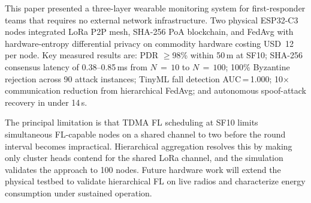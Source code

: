 \documentclass[journal]{IEEEtran}
\begin{document}
This paper presented a three-layer wearable monitoring system for
first-responder teams that requires no external network infrastructure.
Two physical ESP32-C3 nodes integrated LoRa P2P mesh, SHA-256 PoA
blockchain, and FedAvg with hardware-entropy differential privacy on
commodity hardware costing USD~12 per node. Key measured results are:
PDR $\geq$98\% within 50\,m at SF10; SHA-256 consensus latency of
0.38--0.85\,ms from $N\,{=}\,10$ to $N\,{=}\,100$; 100\% Byzantine
rejection across 90 attack instances; TinyML fall detection AUC\,=\,1.000;
10$\times$ communication reduction from hierarchical FedAvg; and
autonomous spoof-attack recovery in under 14\,s.

The principal limitation is that TDMA FL scheduling at SF10 limits
simultaneous FL-capable nodes on a shared channel to two before the round
interval becomes impractical. Hierarchical aggregation resolves this by
making only cluster heads contend for the shared LoRa channel, and the
simulation validates the approach to 100 nodes. Future hardware work will
extend the physical testbed to validate hierarchical FL on live radios and
characterize energy consumption under sustained operation.

\balance


\end{document}
